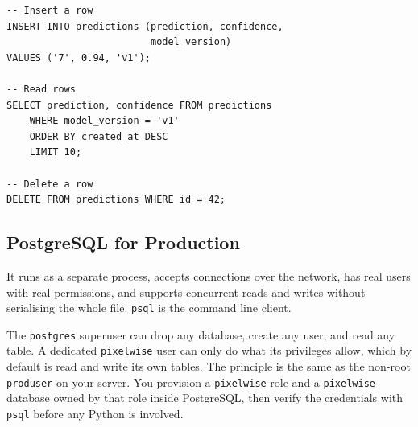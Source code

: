

\begin{verbatim}
-- Insert a row
INSERT INTO predictions (prediction, confidence,
                         model_version)
VALUES ('7', 0.94, 'v1');

-- Read rows
SELECT prediction, confidence FROM predictions
    WHERE model_version = 'v1'
    ORDER BY created_at DESC
    LIMIT 10;

-- Delete a row
DELETE FROM predictions WHERE id = 42;
\end{verbatim}


\vfill
\subsection{PostgreSQL for Production}


It runs as a separate process, accepts connections over the network, has
real users with real permissions, and supports concurrent reads and
writes without serialising the whole file. \texttt{psql} is
the command line client.


The \texttt{postgres} superuser can drop any database, create any user,
and read any table. A dedicated \texttt{pixelwise} user can only do what
its privileges allow, which by default is read and write its own tables.
The principle is the same as the non-root \texttt{produser} on your server.
You provision a \texttt{pixelwise} role and a \texttt{pixelwise} database
owned by that role inside PostgreSQL, then verify the credentials with
\texttt{psql} before any Python is involved.






